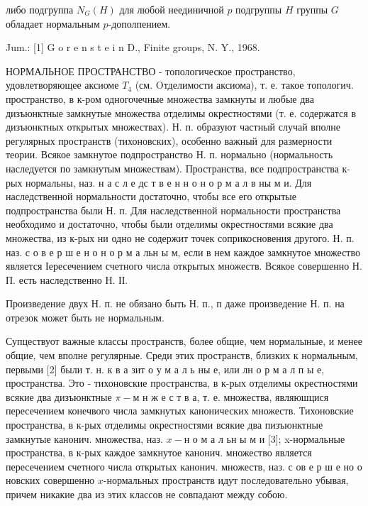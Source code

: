 \documentclass[10pt]{article}
\begin{document}
либо подгруппа $N_{G}(H)$ для любой неединичной $p$ подгруппы $H$ группы $G$ обладает нормальным $p$-дополпением.



Jum.: [1] G o r e n s t e i n D., Finite groups, N. Y., 1968.



НОРМАЛЬНОЕ ПРОСТРАНСТВО - топологическое пространство, удовлетворяющее аксиоме $T_{4}$ (см. Oтделимости аксиома), т. е. такое топологич. пространство, в к-ром одногочечные множества замкнуты и любые два дизъюнктные замкнутые множества отделимы окрестностями (т. е. содержатся в дизъюнктных открытых множествах). Н. п. образуют частный случай вполне регулярных пространств (тихоновских), особенно важный для размерности теории. Всякое замкнутое подпространство Н. п. нормально (нормальность наследуется по замкнутым множествам). Пространства, все подпространства к-рых нормальны, наз. н а с л е дс т в е н н о н о р м а л в ны м и. Для наследственной нормальности достаточно, чтобы все его открытые подпространства были Н. п. Для наследственной нормальности пространства необходимо и достаточно, чтобы были отделимы окрестностями всякие два множества, из к-рых ни одно не содержит точек соприкосновения другого. Н. п. наз. с о в е р ш е н о н о р м а льн ы м, если в нем каждое замкнутое множество является Іересечением счетного числа открытых множеств. Всякое совершенно Н. П. есть наследственно Н. ІІ.



Произведение двух Н. п. не обязано быть Н. п., п даже произведение Н. п. на отрезок может быть не нормальным.



Супцествуот важные классы пространств, более общие, чем нормалыные, и менее общие, чем вполне регулярные. Среди этих пространств, близких к нормальным, первыми [2] были т. н. к в а зит о у м а л ь ны е, или лн о р м а л п ы е, пространства. Это - тихоновские пространства, в к-рых отделимы окрестностями всякие два дизъюнктные $\pi-м$ н ж е с т в а, т. е. множества, являюшцися пересечением конечвого числа замкнутых канонических множеств. Тихоновские пространства, в к-рых отделимы окрестностями всякие два пизъюнктные замкнутые канонич. множества, наз. $x-н$ о м а л ьн ы м и [3]; x-нормальные пространства, в к-рых каждое замкнутое канонич. множество является пересечением счетного числа открытых канонич. множеств, наз. с ов е р ш е но о новских совершенно $x$-нормальных пространств идут последовательно убывая, причем никакие два из этих классов не совпадают между собою.
\end{document}
